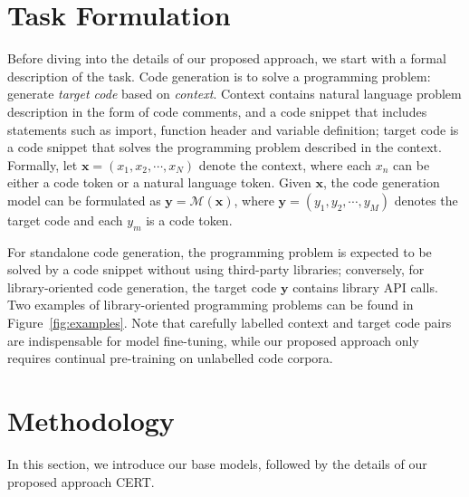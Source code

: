 \documentclass{article}
\newcommand{\cert}{\textsc{CERT}\xspace}
\begin{document}
\section{Task Formulation}\label{sec:formulation}
Before diving into the details of our proposed approach, we start with a formal description of the task.
Code generation is to solve a programming problem: generate \emph{target code} based on \emph{context}. Context contains natural language problem description in the form of code comments, and a code snippet that includes statements such as import, function header and variable definition; target code is a code snippet that solves the programming problem described in the context. Formally, let $\mathbf{x}=(x_1,x_2,{\cdots},x_N)$ denote the context, where each $x_n$ can be either a code token or a natural language token. Given $\mathbf{x}$, the code generation model can be formulated as $\mathbf{y}=\mathcal{M}(\mathbf{x})$, where $\mathbf{y}=(y_1,y_2,{\cdots},y_M)$ denotes the target code and each $y_m$ is a code token.

For standalone code generation, the programming problem is expected to be solved by a code snippet without using third-party libraries; conversely, for library-oriented code generation, the target code $\mathbf{y}$ contains library API calls. Two examples of library-oriented programming problems can be found in Figure~\ref{fig:examples}. Note that carefully labelled context and target code pairs are indispensable for model fine-tuning, while our proposed approach only requires continual pre-training on unlabelled code corpora.

\section{Methodology} \label{methodology}
In this section, we introduce our base models, followed by the details of our proposed approach \cert.
\end{document}
